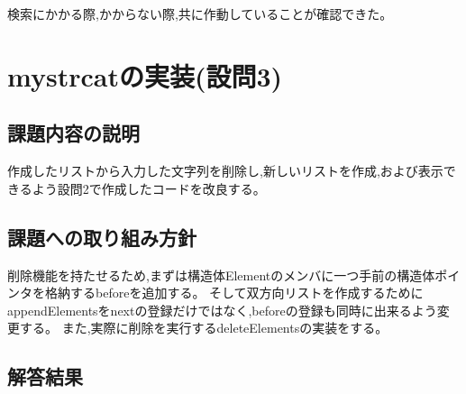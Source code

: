 \documentclass[fontsize = 10pt, paper= a4,twocolumn,column_gap=3zw]{jlreq}
\begin{document}
検索にかかる際,かからない際,共に作動していることが確認できた。

\section{mystrcatの実装(設問3)}
\subsection{課題内容の説明}
作成したリストから入力した文字列を削除し,新しいリストを作成,および表示できるよう設問2で作成したコードを改良する。
\subsection{課題への取り組み方針}
削除機能を持たせるため,まずは構造体Elementのメンバに一つ手前の構造体ポインタを格納するbeforeを追加する。
そして双方向リストを作成するためにappendElementsをnextの登録だけではなく,beforeの登録も同時に出来るよう変更する。
また,実際に削除を実行するdeleteElementsの実装をする。
\subsection{解答結果}
\end{document}
